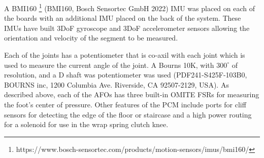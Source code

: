 A BMI160 \footnote{https://www.bosch-sensortec.com/products/motion-sensors/imus/bmi160/} (BMI160, Bosch Sensortec GmbH 2022) IMU was placed on each of the boards with an additional IMU placed on the back of the system. These IMUs have built 3DoF gyroscope and 3DoF accelerometer sensors allowing the orientation and velocity of the segment to be measured. 

Each of the joints has a potentiometer that is co-axil with each joint which is used to measure the current angle of the joint. A Bourns 10K, with $300^{\circ}$ of resolution, and a D shaft was potentiometer was used (PDF241-S425F-103B0, BOURNS inc, 1200 Columbia Ave. Riverside, CA 92507-2129, USA). As described above, each of the AFOs has three built-in OMITE FSRs for measuring the foot's center of pressure. Other features of the PCM include ports for cliff sensors for detecting the edge of the floor or staircase and a high power routing for a solenoid for use in the wrap spring clutch knee. 


